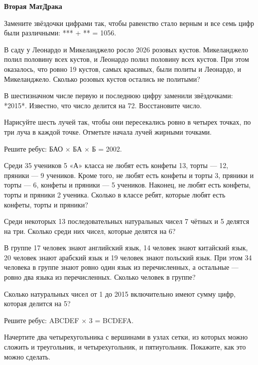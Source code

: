 \centerline{\bf \Huge Вторая МатДрака }

 Замените звёздочки цифрами так, чтобы равенство стало верным
и все семь цифр были различными: *** + ** = 1056.


 В саду у Леонардо и Микеланджело росло 2026 розовых кустов. Микеланджело
полил половину всех кустов, и Леонардо полил половину всех кустов. При этом оказалось, что ровно
19 кустов, самых красивых, были политы и Леонардо, и Микеланджело. Сколько розовых кустов остались
не политыми?

 В шестизначном числе первую и последнюю цифру заменили
звёздочками: *2015*. Известно, что число делится на 72. Восстановите число.


 Нарисуйте шесть лучей так, чтобы они пересекались ровно в четырех точках, по три луча в каждой точке. Отметьте начала лучей жирными точками.


 Решите ребус: БАО $\times$ БА $\times$ Б = 2002.


 Среди 35 учеников 5 «А» класса не любят есть конфеты 13, торты —
12, пряники — 9 учеников. Кроме того, не любят есть конфеты и торты 3, пряники и торты — 6,
конфеты и пряники — 5 учеников. Наконец, не любят есть конфеты, торты и пряники 2 ученика.
Сколько в классе ребят, которые любят есть конфеты, торты и пряники?


 Среди некоторых 13 последовательных натуральных чисел 7 чётных и 5 делятся на три. Сколько среди них чисел, которые делятся на 6?


 В группе 17 человек знают английский язык, 14 человек знают
китайский язык, 20 человек знают арабский язык и 19 человек знают польский язык. При этом
34 человека в группе знают ровно один язык из перечисленных, а остальные — ровно два языка
из перечисленных. Сколько человек в группе?


 Сколько натуральных чисел от 1 до 2015 включительно имеют сумму цифр, которая делится на 5?


 Решите ребус: ABCDEF $\times$ 3 = BCDEFA.


 Начертите два четырехугольника с вершинами в узлах сетки, из которых можно сложить и треугольник, и четырехугольник, и пятиугольник. Покажите, как это можно сделать.


\newpage
\hspace{6mm}

